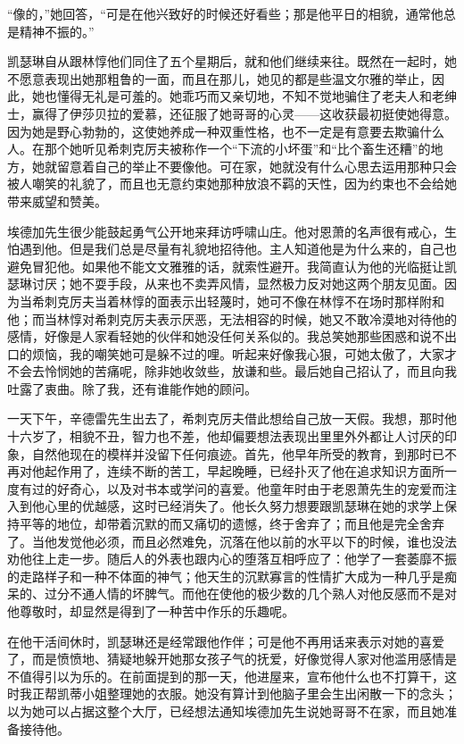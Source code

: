 \par “像的，”她回答，“可是在他兴致好的时候还好看些；那是他平日的相貌，通常他总是精神不振的。”
\par 凯瑟琳自从跟林惇他们同住了五个星期后，就和他们继续来往。既然在一起时，她不愿意表现出她那粗鲁的一面，而且在那儿，她见的都是些温文尔雅的举止，因此，她也懂得无礼是可羞的。她乖巧而又亲切地，不知不觉地骗住了老夫人和老绅士，赢得了伊莎贝拉的爱慕，还征服了她哥哥的心灵——这收获最初挺使她得意。因为她是野心勃勃的，这使她养成一种双重性格，也不一定是有意要去欺骗什么人。在那个她听见希刺克厉夫被称作一个“下流的小坏蛋”和“比个畜生还糟”的地方，她就留意着自己的举止不要像他。可在家，她就没有什么心思去运用那种只会被人嘲笑的礼貌了，而且也无意约束她那种放浪不羁的天性，因为约束也不会给她带来威望和赞美。
\par 埃德加先生很少能鼓起勇气公开地来拜访呼啸山庄。他对恩萧的名声很有戒心，生怕遇到他。但是我们总是尽量有礼貌地招待他。主人知道他是为什么来的，自己也避免冒犯他。如果他不能文文雅雅的话，就索性避开。我简直认为他的光临挺让凯瑟琳讨厌；她不耍手段，从来也不卖弄风情，显然极力反对她这两个朋友见面。因为当希刺克厉夫当着林惇的面表示出轻蔑时，她可不像在林惇不在场时那样附和他；而当林惇对希刺克厉夫表示厌恶，无法相容的时候，她又不敢冷漠地对待他的感情，好像是人家看轻她的伙伴和她没任何关系似的。我总笑她那些困惑和说不出口的烦恼，我的嘲笑她可是躲不过的哩。听起来好像我心狠，可她太傲了，大家才不会去怜悯她的苦痛呢，除非她收敛些，放谦和些。最后她自己招认了，而且向我吐露了衷曲。除了我，还有谁能作她的顾问。
\par 一天下午，辛德雷先生出去了，希刺克厉夫借此想给自己放一天假。我想，那时他十六岁了，相貌不丑，智力也不差，他却偏要想法表现出里里外外都让人讨厌的印象，自然他现在的模样并没留下任何痕迹。首先，他早年所受的教育，到那时已不再对他起作用了，连续不断的苦工，早起晚睡，已经扑灭了他在追求知识方面所一度有过的好奇心，以及对书本或学问的喜爱。他童年时由于老恩萧先生的宠爱而注入到他心里的优越感，这时已经消失了。他长久努力想要跟凯瑟琳在她的求学上保持平等的地位，却带着沉默的而又痛切的遗憾，终于舍弃了；而且他是完全舍弃了。当他发觉他必须，而且必然难免，沉落在他以前的水平以下的时候，谁也没法劝他往上走一步。随后人的外表也跟内心的堕落互相呼应了：他学了一套萎靡不振的走路样子和一种不体面的神气；他天生的沉默寡言的性情扩大成为一种几乎是痴呆的、过分不通人情的坏脾气。而他在使他的极少数的几个熟人对他反感而不是对他尊敬时，却显然是得到了一种苦中作乐的乐趣呢。
\par 在他干活间休时，凯瑟琳还是经常跟他作伴；可是他不再用话来表示对她的喜爱了，而是愤愤地、猜疑地躲开她那女孩子气的抚爱，好像觉得人家对他滥用感情是不值得引以为乐的。在前面提到的那一天，他进屋来，宣布他什么也不打算干，这时我正帮凯蒂小姐整理她的衣服。她没有算计到他脑子里会生出闲散一下的念头；以为她可以占据这整个大厅，已经想法通知埃德加先生说她哥哥不在家，而且她准备接待他。
